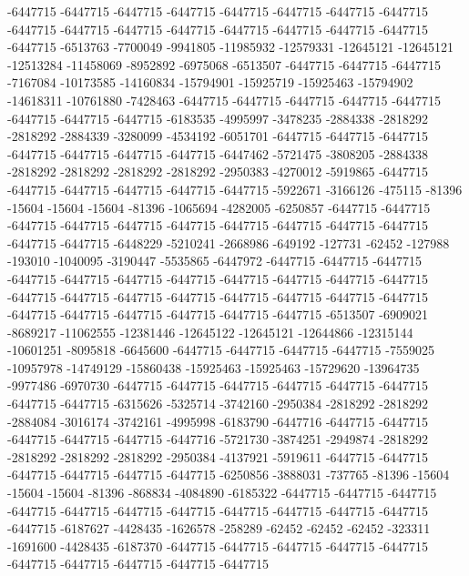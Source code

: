 -6447715 -6447715 -6447715 -6447715 -6447715 -6447715 -6447715 -6447715 -6447715 -6447715 -6447715 -6447715 -6447715 -6447715 -6447715 -6447715 -6447715 -6513763 -7700049 -9941805 -11985932 -12579331 -12645121 -12645121 -12513284 -11458069 -8952892 -6975068 -6513507 -6447715 -6447715 -6447715 -7167084 -10173585 -14160834 -15794901 -15925719 -15925463 -15794902 -14618311 -10761880 -7428463 -6447715 -6447715 -6447715 -6447715 -6447715 -6447715 -6447715 -6447715 -6183535 -4995997 -3478235 -2884338 -2818292 -2818292 -2884339 -3280099 -4534192 -6051701 -6447715 -6447715 -6447715 -6447715 -6447715 -6447715 -6447715 -6447462 -5721475 -3808205 -2884338 -2818292 -2818292 -2818292 -2818292 -2950383 -4270012 -5919865 -6447715 -6447715 -6447715 -6447715 -6447715 -6447715 -5922671 -3166126 -475115 -81396 -15604 -15604 -15604 -81396 -1065694 -4282005 -6250857 -6447715 -6447715 -6447715 -6447715 -6447715 -6447715 -6447715 -6447715 -6447715 -6447715 -6447715 -6447715 -6448229 -5210241 -2668986 -649192 -127731 -62452 -127988 -193010 -1040095 -3190447 -5535865 -6447972 -6447715 -6447715 -6447715 -6447715 -6447715 -6447715 -6447715 -6447715 -6447715
-6447715 -6447715 -6447715 -6447715 -6447715 -6447715 -6447715 -6447715 -6447715 -6447715 -6447715 -6447715 -6447715 -6447715 -6447715 -6447715 -6513507 -6909021 -8689217 -11062555 -12381446 -12645122 -12645121 -12644866 -12315144 -10601251 -8095818 -6645600 -6447715 -6447715 -6447715 -6447715 -7559025 -10957978 -14749129 -15860438 -15925463 -15925463 -15729620 -13964735 -9977486 -6970730 -6447715 -6447715 -6447715 -6447715 -6447715 -6447715 -6447715 -6447715 -6315626 -5325714 -3742160 -2950384 -2818292 -2818292 -2884084 -3016174 -3742161 -4995998 -6183790 -6447716 -6447715 -6447715 -6447715 -6447715 -6447715 -6447716 -5721730 -3874251 -2949874 -2818292 -2818292 -2818292 -2818292 -2950384 -4137921 -5919611 -6447715 -6447715 -6447715 -6447715 -6447715 -6447715 -6250856 -3888031 -737765 -81396 -15604 -15604 -15604 -81396 -868834 -4084890 -6185322 -6447715 -6447715 -6447715 -6447715 -6447715 -6447715 -6447715 -6447715 -6447715 -6447715 -6447715 -6447715 -6187627 -4428435 -1626578 -258289 -62452 -62452 -62452 -323311 -1691600 -4428435 -6187370 -6447715 -6447715 -6447715 -6447715 -6447715 -6447715 -6447715 -6447715 -6447715 -6447715
